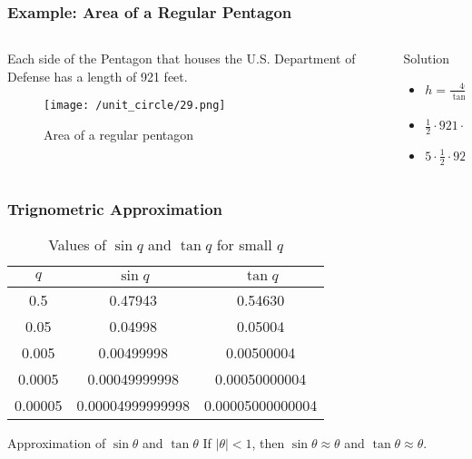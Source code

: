     \begin{frame}
        \frametitle{Example: Area of a Regular Pentagon}
    \begin{columns}
        \begin{column}{0.5\textwidth}
            Each side of the Pentagon that houses the U.S. Department of Defense has a length of 921 feet.
            \begin{figure}
                \centering
                \texttt{[image: /unit\_circle/29.png]}
                \caption{Area of a regular pentagon}
            \end{figure}
        \end{column}
        \begin{column}{0.5\textwidth}
            \begin{block}{Solution}
                \begin{itemize}
                    \item \(h = \frac{460.5}{\tan (\frac{\pi}{5})}\) 
                    \item \(\frac{1}{2} \cdot 921 \cdot h\)
                    \item \(5 \cdot \frac{1}{2} \cdot 921 \cdot h\)
                \end{itemize}
            \end{block}
        \end{column}
    \end{columns}
    \end{frame}

    \begin{frame}
    \frametitle{Trignometric Approximation}

    \begin{table}[h]
        \centering
        \begin{tabular}{|c|c|c|}
            \hline
            $q$ & $\sin q$ & $\tan q$ \\
            \hline
            0.5 & 0.47943 & 0.54630 \\
            0.05 & 0.04998 & 0.05004 \\
            0.005 & 0.00499998 & 0.00500004 \\
            0.0005 & 0.00049999998 & 0.00050000004 \\
            0.00005 & 0.00004999999998 & 0.00005000000004 \\
            \hline
        \end{tabular}
        \caption{Values of $\sin q$ and $\tan q$ for small $q$}
    \end{table}

    \begin{block}{Approximation of \(\sin \theta\) and \(\tan \theta\)}
        If \(| \theta | < 1\), then \(\sin \theta \approx \theta\) and \(\tan \theta \approx \theta\).
    \end{block}

    \end{frame}
